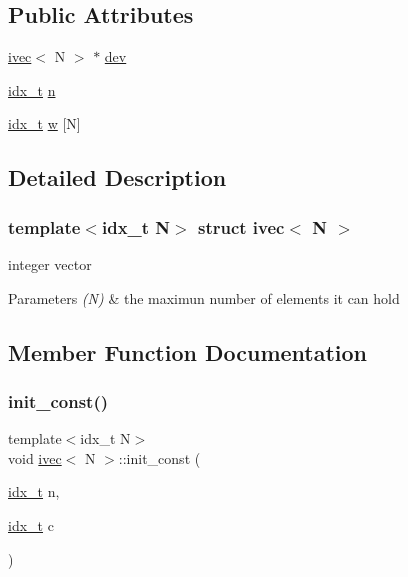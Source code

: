 \subsection*{Public Attributes}
\begin{DoxyCompactItemize}
\item 
\hyperlink{structivec}{ivec}$<$ N $>$ $\ast$ \hyperlink{structivec_ac50ca2c5bec8b1fd9e84fb8cba681ed6}{dev}
\item 
\hyperlink{vgg__util_8h_a8e93478a00e685bea5e6a3f617bf03a3}{idx\+\_\+t} \hyperlink{structivec_ad067032ec2cffe11fddfa932aa2380d1}{n}
\item 
\hyperlink{vgg__util_8h_a8e93478a00e685bea5e6a3f617bf03a3}{idx\+\_\+t} \hyperlink{structivec_a8abb4460bee21f081dda79fce44f0dfc}{w} \mbox{[}N\mbox{]}
\end{DoxyCompactItemize}


\subsection{Detailed Description}
\subsubsection*{template$<$idx\+\_\+t N$>$\newline
struct ivec$<$ N $>$}

integer vector 


\begin{DoxyParams}{Parameters}
{\em (\+N)} & the maximun number of elements it can hold \\
\hline
\end{DoxyParams}


\subsection{Member Function Documentation}
\mbox{\label{structivec_a1bf61db14d42b86afa9e0823fd351624}} 
\subsubsection{\texorpdfstring{init\+\_\+const()}{init\_const()}}
{\footnotesize\ttfamily template$<$idx\+\_\+t N$>$ \\
void \hyperlink{structivec}{ivec}$<$ N $>$\+::init\+\_\+const (\begin{DoxyParamCaption}\item[{\hyperlink{vgg__util_8h_a8e93478a00e685bea5e6a3f617bf03a3}{idx\+\_\+t}}]{n,  }\item[{\hyperlink{vgg__util_8h_a8e93478a00e685bea5e6a3f617bf03a3}{idx\+\_\+t}}]{c }\end{DoxyParamCaption})\hspace{0.3cm}{\ttfamily [inline]}}



